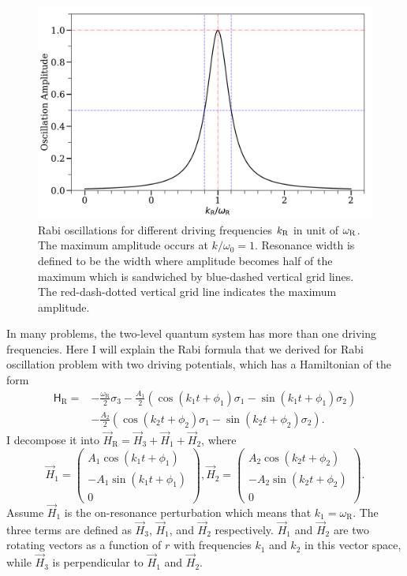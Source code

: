 \begin{figure}[htbp]
    \centering
    \includegraphics[width=\textwidth]{chapters/assets/app/rabi-resonance-width}
    \caption{Rabi oscillations for different driving frequencies $k_\mathrm R$ in unit of $\omega_\mathrm R$. The maximum amplitude occurs at $k/\omega_0=1$. Resonance width is defined to be the width where amplitude becomes half of the maximum which is sandwiched by blue-dashed vertical grid lines. The red-dash-dotted vertical grid line indicates the maximum amplitude.}
    \label{app-fig:rabi-resonance-width}
\end{figure}


In many problems, the two-level quantum system has more than one driving frequencies. Here I will explain the Rabi formula that we derived for Rabi oscillation problem with two driving potentials, which has a Hamiltonian of the form
\begin{align*}
    \mathsf H_{\mathrm R} =& -\frac{\omega_{\mathrm R}}{2}\sigma_3 - \frac{A_{1} }{2}  \left( \cos(k_{1} t +\phi_{1})\sigma_1  - \sin(k_{1} t +\phi_{1}) \sigma_2\right) \nonumber\\
    & - \frac{A_{2} }{2}  \left( \cos(k_{2} t +\phi_{2})\sigma_1  - \sin(k_{2} t +\phi_{2}) \sigma_2\right).
\end{align*}
I decompose it into $\vec{H}_{\mathrm R}=\vec{H}_3 + \vec{H}_{1} + \vec{H}_2$, where
\begin{equation*}
    \vec{H}_1 =  \begin{pmatrix}
     A_{1} \cos(k_{1}t+\phi_{1}) \\
     -A_{1} \sin(k_{1}t+\phi_{1})  \\
     0
   \end{pmatrix},   \vec{H}_2 =  \begin{pmatrix}
     A_{2} \cos(k_{2}t+\phi_{2}) \\
     -A_{2} \sin(k_{2}t+\phi_{2})  \\
     0
      \end{pmatrix}.
\end{equation*}
Assume $\vec{H}_1$ is the on-resonance perturbation which means that $k_1 = \omega_{\mathrm{R}}$. The three terms are defined as $\vec H_3$, $\vec H_1$, and $\vec H_2$ respectively. $\vec H_1$ and $\vec H_2$ are two rotating vectors as a function of $r$ with frequencies $k_1$ and $k_2$ in this vector space, while $\vec H_3$ is perpendicular to $\vec H_1$ and $\vec H_2$.

